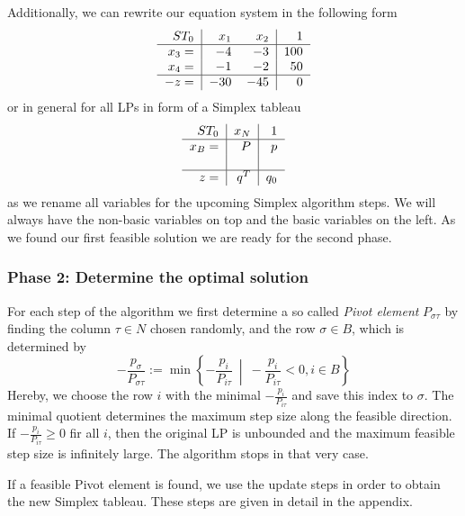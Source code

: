 \documentclass[a4paper, 11pt]{article}
\begin{document}
Additionally, we can rewrite our equation system in the following form
\begin{equation*}
	\begin{tabular}{r|rr|r}
		$ST_0$&$x_1$&$x_2$&$1$\\
		\hline
		$x_3=$&$-4$&$-3$&$100$\\
		$x_4=$&$-1$&$-2$&$50$\\
		\hline
		$-z=$&$-30$&$-45$&$0$
	\end{tabular}
\end{equation*}
or in general for all LPs in form of a Simplex tableau
\begin{equation}
	\begin{tabular}{r|r|r}
		$ST_0$&$x_N$&$1$\\
		\hline
		$x_B=$&$P$&$p$\\
		&&\\
		\hline
		$z=$&$q^T$&$q_0$
	\end{tabular}
\end{equation}
as we rename all variables for the upcoming Simplex algorithm steps. We will always have the non-basic variables on top and the basic variables on the left. As we found our first feasible solution we are ready for the second phase.

\subsubsection{Phase 2: Determine the optimal solution}

For each step of the algorithm we first determine a so called \textit{Pivot element} $P_{\sigma\tau}$ by finding the column $\tau\in N$ chosen randomly, and the row $\sigma\in B$, which is determined by
\begin{equation}
	\label{Pivotsel}
	- \dfrac{p_\sigma}{P_{\sigma\tau}} := \min \left\{ -\frac{p_i}{P_{i\tau}}\ \middle|\ -\frac{p_i}{P_{i\tau}} < 0, i\in B \right\}
\end{equation} 
Hereby, we choose the row $i$ with the minimal $-\frac{p_i}{P_{i\tau}}$ and save this index to $\sigma$. The minimal quotient determines the maximum step size along the feasible direction. If $-\frac{p_i}{P_{i\tau}}\geq 0$ fir all $i$, then the original LP is unbounded and the maximum feasible step size is infinitely large. The algorithm stops in that very case. \medskip

If a feasible Pivot element is found, we use the update steps in order to obtain the new Simplex tableau. These steps are given in detail in the appendix. \medskip
\end{document}
